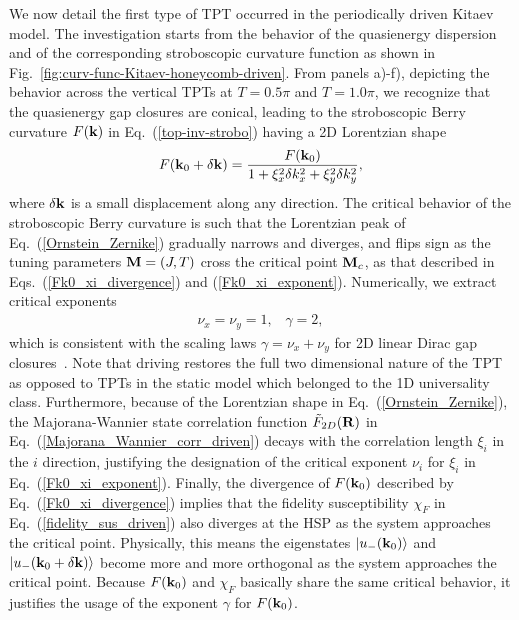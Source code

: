 \documentclass[aps,prb,twocolumn,superscriptaddress,groupedaddress]{revtex4}
\begin{document}
We now detail the first type of TPT occurred in the periodically driven Kitaev model. The investigation starts from the behavior of the quasienergy dispersion and of the corresponding stroboscopic curvature function as shown in Fig.~\ref{fig:curv-func-Kitaev-honeycomb-driven}.
From panels a)-f), depicting the behavior across the vertical TPTs at $T=0.5\pi$ and $T=1.0\pi$, we recognize that the quasienergy gap closures are conical, leading to the stroboscopic Berry curvature $F({\bf k})$ in Eq.~(\ref{top-inv-strobo}) having a 2D Lorentzian shape
%
\begin{eqnarray}
F({\bf k}_{0}+\delta{\bf k})=\frac{F({\bf k}_{0})}{1+\xi_{x}^{2}\delta k_{x}^{2}+\xi_{y}^{2}\delta k_{y}^{2}}, 
\label{Ornstein_Zernike}
\end{eqnarray}
%
where $\delta{\bf k}$ is a small displacement along any direction. The critical behavior of the stroboscopic Berry curvature is such that the Lorentzian peak of Eq.~(\ref{Ornstein_Zernike}) gradually narrows and diverges, and flips sign as the tuning parameters ${\bf M}=(J,T)$ cross the critical point ${\bf M}_{c}$, as that described in Eqs.~(\ref{Fk0_xi_divergence}) and (\ref{Fk0_xi_exponent}). Numerically, we extract critical exponents
% 
\begin{eqnarray}
\nu_{x}=\nu_{y}=1,\;\;\;\gamma=2,
\end{eqnarray}
%
which is consistent with the scaling laws $\gamma=\nu_{x}+\nu_{y}$ for 2D linear Dirac gap closures~\cite{Chen:2016, Chen-Sigrist:2016, Chen:2017, Kourtis17, Chen:2018, Molignini:2018, Chen-Sigrist-book:2019, Molignini:2019, Chen-Schnyder:2019, MoligniniReview:2019, Malard20_multicritical}.  Note that driving restores the full two dimensional nature of the TPT as opposed to TPTs in  the static model which belonged to the 1D universality class.  Furthermore, because of the Lorentzian shape in Eq.~(\ref{Ornstein_Zernike}), the Majorana-Wannier state correlation function $\tilde{F}_{2D}({\bf R})$ in Eq.~(\ref{Majorana_Wannier_corr_driven}) decays with the correlation length $\xi_{i}$ in the $i$ direction, justifying the designation of the critical exponent $\nu_{i}$ for $\xi_{i}$ in Eq.~(\ref{Fk0_xi_exponent}). Finally, the divergence of $F({\bf k}_{0})$ described by Eq.~(\ref{Fk0_xi_divergence}) implies that the fidelity susceptibility $\chi_{F}$ in Eq.~(\ref{fidelity_sus_driven}) also diverges at the HSP as the system approaches the critical point. Physically, this means the eigenstates $|u_{-}({\bf k}_{0})\rangle$ and $|u_{-}({\bf k}_{0}+\delta{\bf k})\rangle$ become more and more orthogonal as the system approaches the critical point. 
Because $F({\bf k}_{0})$ and $\chi_{F}$ basically share the same critical behavior, it justifies the usage of the exponent $\gamma$ for $F({\bf k}_{0})$. 
\end{document}
